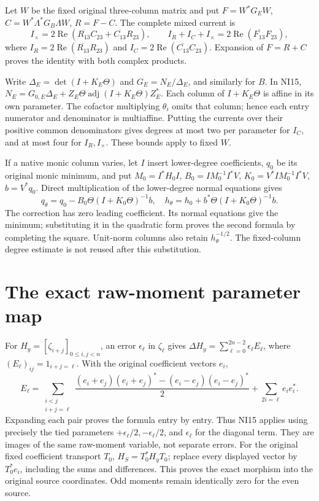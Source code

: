 \documentclass[11pt]{article}
\begin{document}
Let \(W\) be the fixed original three-column matrix and put
\(F=W^*G_EW\), \(C=W^*\Lambda^*G_B\Lambda W\), \(R=F-C\).
The complete mixed current is
\begin{equation}\tag{NI16}
 I_\times=2\operatorname{Re}
  (\overline{R_{13}}C_{23}+\overline{C_{13}}R_{23}),\qquad
 I_R+I_C+I_\times=2\operatorname{Re}(\overline{F_{13}}F_{23}),
\end{equation}
where \(I_R=2\operatorname{Re}(\overline{R_{13}}R_{23})\)
and \(I_C=2\operatorname{Re}(\overline{C_{13}}C_{23})\).
Expansion of \(F=R+C\) proves the identity with both complex products.

Write \(\Delta_E=\det(I+K_E\Theta)\) and \(G_E=N_E/\Delta_E\),
and similarly for \(B\). In NI15,
\(N_E=G_{0,E}\Delta_E+Z_E\Theta\operatorname{adj}(I+K_E\Theta)Z_E^*\).
Each column of \(I+K_E\Theta\) is affine in its own parameter.
The cofactor multiplying \(\theta_i\) omits that column; hence each
entry numerator and denominator is multiaffine.
Putting the currents over their positive common denominators
gives degrees at most two per parameter for \(I_C\), and at most
four for \(I_R,I_\times\). These bounds apply to fixed \(W\).

If a native monic column varies, let \(I\) insert lower-degree
coefficients, \(q_0\) be its original monic minimum, and put
\(M_0=I^*H_0I\), \(B_0=IM_0^{-1}I^*V\),
\(K_0=V^*IM_0^{-1}I^*V\), \(b=V^*q_0\).
Direct multiplication of the lower-degree normal equations gives
\begin{equation}\tag{NI17}
 q_\theta=q_0-B_0\Theta(I+K_0\Theta)^{-1}b,\quad
 h_\theta=h_0+b^*\Theta(I+K_0\Theta)^{-1}b.
\end{equation}
The correction has zero leading coefficient. Its normal equations
give the minimum; substituting it in the quadratic form proves the
second formula by completing the square. Unit-norm columns also
retain \(h_\theta^{-1/2}\). The fixed-column degree estimate is
not reused after this substitution.

\section{The exact raw-moment parameter map}
For \(H_y=[\zeta_{i+j}]_{0\le i,j<n}\), an error \(\epsilon_\ell\)
in \(\zeta_\ell\) gives
\(\Delta H_y=\sum_{\ell=0}^{2n-2}\epsilon_\ell E_\ell\),
where \((E_\ell)_{ij}=1_{i+j=\ell}\).
With the original coefficient vectors \(e_i\),
\begin{equation}\tag{NI18}
 E_\ell=
 \sum_{\substack{i<j\\i+j=\ell}}
 \frac{(e_i+e_j)(e_i+e_j)^*-(e_i-e_j)(e_i-e_j)^*}{2}
 +\sum_{2i=\ell}e_ie_i^* .
\end{equation}
Expanding each pair proves the formula entry by entry.
Thus NI15 applies using precisely the tied parameters
\(+\epsilon_\ell/2,-\epsilon_\ell/2\), and
\(\epsilon_\ell\) for the diagonal term.
They are images of the same raw-moment variable, not separate errors.
For the original fixed coefficient transport \(T_0\),
\(H_S=T_0^*H_yT_0\); replace every displayed vector by
\(T_0^*e_i\), including the sums and differences.
This proves the exact morphism into the original source coordinates.
Odd moments remain identically zero for the even source.
\end{document}
